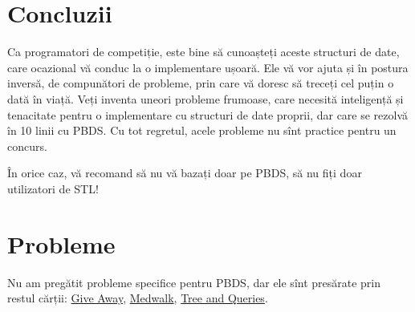 \documentclass[../main.tex]{subfiles}
\begin{document}
\section{Concluzii}

Ca programatori de competiție, este bine să cunoașteți aceste structuri de date, care ocazional vă conduc la o implementare ușoară. Ele vă vor ajuta și în postura inversă, de compunători de probleme, prin care vă doresc să treceți cel puțin o dată în viață. Veți inventa uneori probleme frumoase, care necesită inteligență și tenacitate pentru o implementare cu structuri de date proprii, dar care se rezolvă în 10 linii cu PBDS. Cu tot regretul, acele probleme nu sînt practice pentru un concurs.

În orice caz, vă recomand să nu vă bazați doar pe PBDS, să nu fiți doar utilizatori de STL!


\section{Probleme}

Nu am pregătit probleme specifice pentru PBDS, dar ele sînt presărate prin restul cărții: \hyperref[problem:give-away]{Give Away}, \hyperref[problem:medwalk]{Medwalk}, \hyperref[problem:tree-and-queries]{Tree and Queries}.
\end{document}
